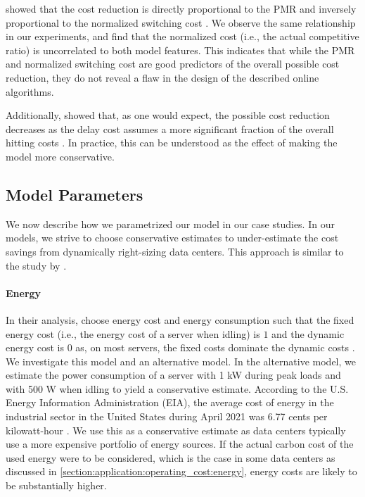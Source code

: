 \citeauthor*{Lin2011} showed that the cost reduction is directly proportional to the PMR and inversely proportional to the normalized switching cost \cite{Lin2011}. We observe the same relationship in our experiments, and find that the normalized cost (i.e., the actual competitive ratio) is uncorrelated to both model features. This indicates that while the PMR and normalized switching cost are good predictors of the overall possible cost reduction, they do not reveal a flaw in the design of the described online algorithms.

Additionally, \citeauthor*{Lin2011} showed that, as one would expect, the possible cost reduction decreases as the delay cost assumes a more significant fraction of the overall hitting costs \cite{Lin2011}. In practice, this can be understood as the effect of making the model more conservative.

\subsection{Model Parameters}

We now describe how we parametrized our model in our case studies. In our models, we strive to choose conservative estimates to under-estimate the cost savings from dynamically right-sizing data centers. This approach is similar to the study by \citeauthor*{Lin2011}.

\paragraph{Energy} In their analysis, \citeauthor*{Lin2011} choose energy cost and energy consumption such that the fixed energy cost (i.e., the energy cost of a server when idling) is $1$ and the dynamic energy cost is $0$ as, on most servers, the fixed costs dominate the dynamic costs \cite{Clark2005, Lin2011}. We investigate this model and an alternative model. In the alternative model, we estimate the power consumption of a server with 1 kW during peak loads and with 500 W when idling to yield a conservative estimate. According to the U.S. Energy Information Administration (EIA), the average cost of energy in the industrial sector in the United States during April 2021 was 6.77 cents per kilowatt-hour \cite{EIA2021}. We use this as a conservative estimate as data centers typically use a more expensive portfolio of energy sources. If the actual carbon cost of the used energy were to be considered, which is the case in some data centers as discussed in \autoref{section:application:operating_cost:energy}, energy costs are likely to be substantially higher.

